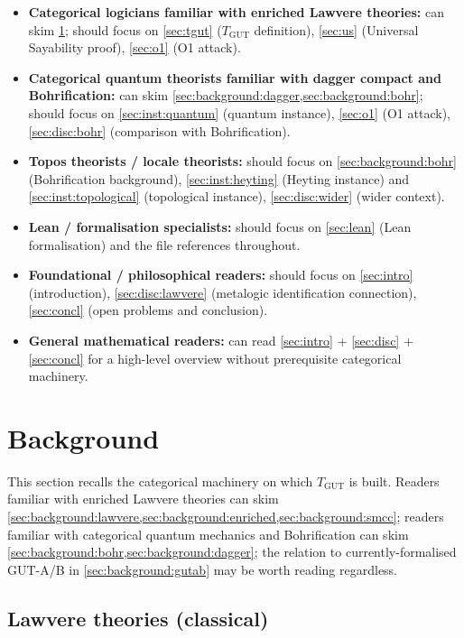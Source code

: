 \documentclass[11pt,a4paper]{article}
\theoremstyle{plain}
\theoremstyle{definition}
\theoremstyle{remark}
\newcommand{\TGUT}{T_{\mathrm{GUT}}}
\begin{document}
\begin{itemize}[leftmargin=*]
\item \textbf{Categorical logicians familiar with enriched Lawvere theories:} can skim \cref{sec:background}; should focus on \cref{sec:tgut} ($\TGUT$ definition), \cref{sec:us} (Universal Sayability proof), \cref{sec:o1} (O1 attack).
\item \textbf{Categorical quantum theorists familiar with dagger compact and Bohrification:} can skim \cref{sec:background:dagger,sec:background:bohr}; should focus on \cref{sec:inst:quantum} (quantum instance), \cref{sec:o1} (O1 attack), \cref{sec:disc:bohr} (comparison with Bohrification).
\item \textbf{Topos theorists / locale theorists:} should focus on \cref{sec:background:bohr} (Bohrification background), \cref{sec:inst:heyting} (Heyting instance) and \cref{sec:inst:topological} (topological instance), \cref{sec:disc:wider} (wider context).
\item \textbf{Lean / formalisation specialists:} should focus on \cref{sec:lean} (Lean formalisation) and the file references throughout.
\item \textbf{Foundational / philosophical readers:} should focus on \cref{sec:intro} (introduction), \cref{sec:disc:lawvere} (metalogic identification connection), \cref{sec:concl} (open problems and conclusion).
\item \textbf{General mathematical readers:} can read \cref{sec:intro} + \cref{sec:disc} + \cref{sec:concl} for a high-level overview without prerequisite categorical machinery.
\end{itemize}

\section{Background}\label{sec:background}

This section recalls the categorical machinery on which $\TGUT$ is built. Readers familiar with enriched Lawvere theories can skim \cref{sec:background:lawvere,sec:background:enriched,sec:background:smcc}; readers familiar with categorical quantum mechanics and Bohrification can skim \cref{sec:background:bohr,sec:background:dagger}; the relation to currently-formalised GUT-A/B in \cref{sec:background:gutab} may be worth reading regardless.

\subsection{Lawvere theories (classical)}\label{sec:background:lawvere}
\end{document}

